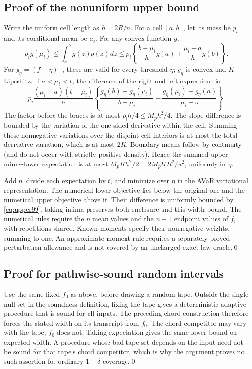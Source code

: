 \subsection{Proof of the nonuniform upper bound}
Write the uniform cell length as $h=2R/n$. For a cell $[a,b]$, let its mass be $p_i$ and its conditional mean be $\mu_i$. For any convex function $g$,
\[
 p_i g(\mu_i)\le\int_{a}^{b}g(z)p(z)\,dz
 \le p_i\left\{\frac{b-\mu_i}{h}g(a)+\frac{\mu_i-a}{h}g(b)\right\}.
\]
For $g_\eta=(f-\eta)_+$, these are valid for every threshold $\eta$; $g_\eta$ is convex and $K$-Lipschitz. If $a<\mu_i<b$, the difference of the right and left expressions is
\[
 p_i\frac{(\mu_i-a)(b-\mu_i)}{h}
 \left\{\frac{g_\eta(b)-g_\eta(\mu_i)}{b-\mu_i}
          -\frac{g_\eta(\mu_i)-g_\eta(a)}{\mu_i-a}\right\}.
\]
The factor before the braces is at most $p_i h/4\le M_ph^2/4$. The slope difference is bounded by the variation of the one-sided derivative within the cell. Summing these nonnegative variations over the disjoint cell interiors is at most the total derivative variation, which is at most $2K$. Boundary means follow by continuity (and do not occur with strictly positive density). Hence the summed upper-minus-lower expectation is at most $M_pKh^2/2=2M_pKR^2/n^2$, uniformly in $\eta$.

Add $\eta$, divide each expectation by $t$, and minimize over $\eta$ in the AVaR variational representation. The numerical lower objective lies below the original one and the numerical upper objective above it. Their difference is uniformly bounded by \eqref{eq:upper99}; taking infima preserves both enclosure and this width bound. The numerical rules require the $n$ mean values and the $n+1$ endpoint values of $f$, with repetitions shared. Known moments specify their nonnegative weights, summing to one. An approximate moment rule requires a separately proved perturbation allowance and is not covered by an uncharged exact-law oracle.\qed

\subsection{Proof for pathwise-sound random intervals}
Use the same fixed $f_0$ as above, before drawing a random tape. Outside the single null set in the soundness definition, fixing the tape gives a deterministic adaptive procedure that is sound for all inputs. The preceding chord construction therefore forces the stated width on its transcript from $f_0$. The chord competitor may vary with the tape; $f_0$ does not. Taking expectation gives the same lower bound on expected width. A procedure whose bad-tape set depends on the input need not be sound for that tape's chord competitor, which is why the argument proves no such assertion for ordinary $1-\delta$ coverage.\qed

